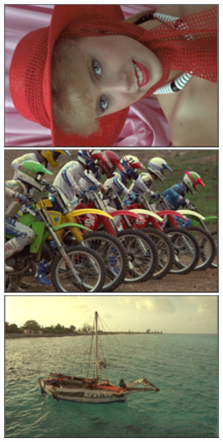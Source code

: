 \documentclass[10pt,twocolumn,letterpaper]{article}
\begin{document}
\begin{figure}
{\begin{minipage}{0.075\textwidth}
\end{minipage}
\begin{minipage}{0.075\textwidth}
\includegraphics[width=1\textwidth]{24images/resize_kodim04.png}
\end{minipage}
\begin{minipage}{0.075\textwidth}
\includegraphics[width=1\textwidth]{24images/resize_kodim05.png}
\end{minipage}
\begin{minipage}{0.075\textwidth}
\includegraphics[width=1\textwidth]{24images/resize_kodim06.png}

\end{minipage}}
\end{figure}
\end{document}
